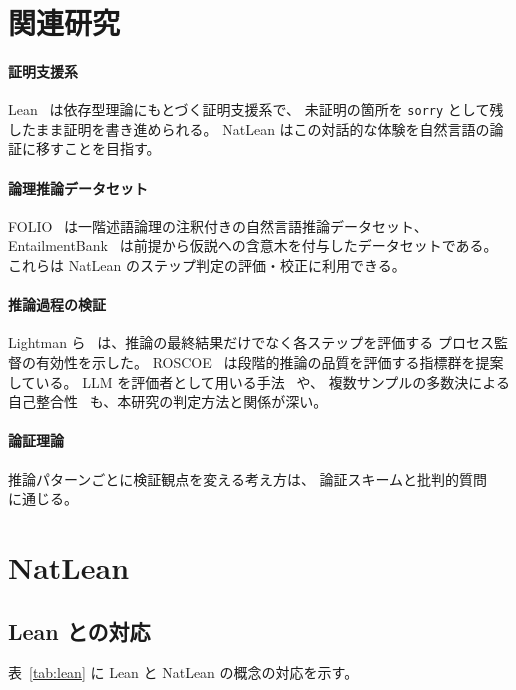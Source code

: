 \documentclass[a4paper,11pt]{ltjsarticle}
\begin{document}
\section{関連研究}

\paragraph{証明支援系}
Lean~\cite{moura2021lean4} は依存型理論にもとづく証明支援系で、
未証明の箇所を \texttt{sorry} として残したまま証明を書き進められる。
NatLean はこの対話的な体験を自然言語の論証に移すことを目指す。

\paragraph{論理推論データセット}
FOLIO~\cite{han2022folio} は一階述語論理の注釈付きの自然言語推論データセット、
EntailmentBank~\cite{dalvi2021entailmentbank} は前提から仮説への含意木を付与したデータセットである。
これらは NatLean のステップ判定の評価・校正に利用できる。

\paragraph{推論過程の検証}
Lightman ら~\cite{lightman2023verify} は、推論の最終結果だけでなく各ステップを評価する
プロセス監督の有効性を示した。
ROSCOE~\cite{golovneva2023roscoe} は段階的推論の品質を評価する指標群を提案している。
LLM を評価者として用いる手法~\cite{zheng2023judging} や、
複数サンプルの多数決による自己整合性~\cite{wang2023selfconsistency} も、本研究の判定方法と関係が深い。

\paragraph{論証理論}
推論パターンごとに検証観点を変える考え方は、
論証スキームと批判的質問~\cite{walton2008argumentation} に通じる。

\section{NatLean}

\subsection{Lean との対応}

表~\ref{tab:lean} に Lean と NatLean の概念の対応を示す。
\end{document}
